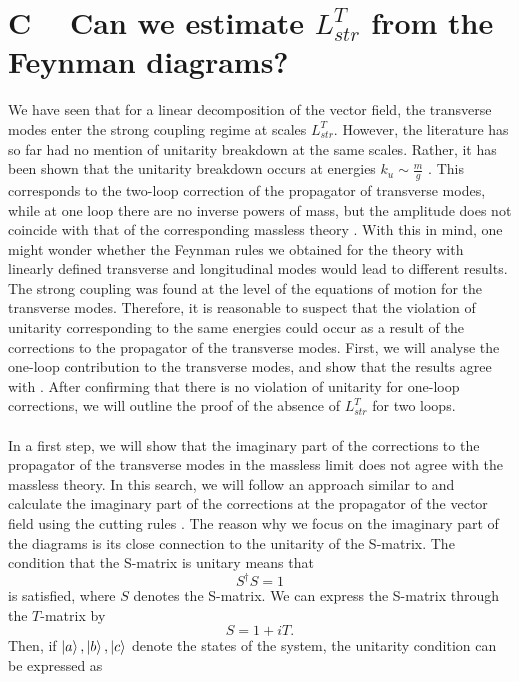 \documentclass{article}
\begin{document}
\section*{\textbf{C}$\quad$ Can we estimate $L^T_{str}$ from the Feynman diagrams?}
We have seen that for a linear decomposition of the vector field, the transverse modes enter the strong coupling regime at scales $L^T_{str}$. However, the literature has so far had no mention of unitarity breakdown at the same scales. Rather, it has been shown that the unitarity breakdown occurs at energies $k_u\sim\frac{m}{g}$ \cite{VeltmanReiff}. This corresponds to the two-loop correction of the propagator of transverse modes, while at one loop there are no inverse powers of mass, but the amplitude does not coincide with that of the corresponding massless theory \cite{vDVZ}. 
With this in mind, one might wonder whether the Feynman rules we obtained for the theory with linearly defined transverse and longitudinal modes would lead to different results. The strong coupling was found at the level of the equations of motion for the transverse modes. Therefore, it is reasonable to suspect that the violation of unitarity corresponding to the same energies could occur as a result of the corrections to the propagator of the transverse modes. First, we will analyse the one-loop contribution to the transverse modes, and show that the results agree with \cite{vDVZ}. After confirming that there is no violation of unitarity for one-loop corrections, we will outline the proof of the absence of $L^T_{str}$ for two loops.
\\\\
In a first step, we will show that the imaginary part of the corrections to the propagator of the transverse modes in the massless limit does not agree with the massless theory. In this search, we will follow an approach similar to \cite{Veltman1968, VeltmanReiff, vDVZ} and calculate the imaginary part of the corrections at the propagator of the vector field using the cutting rules \cite{Cutkosky}. The reason why we focus on the imaginary part of the diagrams is its close connection to the unitarity of the S-matrix. The condition that the S-matrix is unitary means that 
\begin{equation}
    S^{\dag}S=1
\end{equation}
is satisfied, where $S$ denotes the S-matrix. We can express the S-matrix through the $T$-matrix by
\begin{equation}
    S=1+iT.
\end{equation}
Then, if $\ket{a},\ket{b}, \ket{c}$ denote the states of the system, the unitarity condition can be expressed as  
\end{document}
